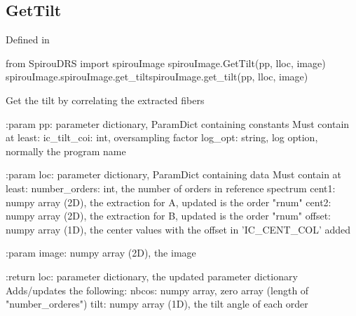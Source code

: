 \noindent\begin{minipage}{\textwidth}
\subsection{GetTilt}

Defined in \spirouImage{}

\begin{pythonbox}
from SpirouDRS import spirouImage
spirouImage.GetTilt(pp, lloc, image)
spirouImage.spirouImage.get_tiltspirouImage.get_tilt(pp, lloc, image)
\end{pythonbox}

\begin{pythondocstring}
Get the tilt by correlating the extracted fibers

:param pp: parameter dictionary, ParamDict containing constants
    Must contain at least:
            ic_tilt_coi: int, oversampling factor
            log_opt: string, log option, normally the program name

:param loc: parameter dictionary, ParamDict containing data
        Must contain at least:
            number_orders: int, the number of orders in reference spectrum
            cent1: numpy array (2D), the extraction for A, updated is
                   the order "rnum"
            cent2: numpy array (2D), the extraction for B, updated is
                   the order "rnum"
            offset: numpy array (1D), the center values with the
                    offset in 'IC_CENT_COL' added

:param image: numpy array (2D), the image

:return loc: parameter dictionary, the updated parameter dictionary
        Adds/updates the following:
            nbcos: numpy array, zero array  (length of "number_orderes")
            tilt: numpy array (1D), the tilt angle of each order
\end{pythondocstring}
\end{minipage}


